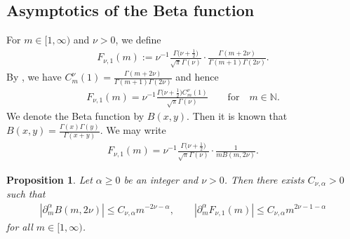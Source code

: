\documentclass[11pt]{article}
\numberwithin{equation}{section}
\newtheorem{Proposition}[Theorem]{Proposition}
 { \theoremstyle{definition}
\newtheorem{Definition}[Theorem]{Definition}
\newtheorem{Note}[Theorem]{Note}
\newtheorem{Example}[Theorem]{Example}
\newtheorem{Remark}[Theorem]{Remark} }
\def\a{\alpha}
\def\n{\nu}
\def\pa{\partial}
\begin{document}
\setcounter{subsection}{4}\setcounter{Theorem}{9}
\subsection{Asymptotics of the Beta function}\label{subsecasymbeta}

For $m\in [1,\infty)$ and $\n>0$, we define
\begin{align}\label{Fnu1def}
F_{\n,1}(m):=\n^{-1}\frac{\Gamma\bigl(\n+\frac{1}{2}\bigr)}{\sqrt{\pi}\Gamma(\n)}\cdot \frac{\Gamma(m+2\n)}{\Gamma(m+1)\Gamma(2\n)}.
\end{align}
By \cite[Fact 4.8, equation~(4.30)]{BKO}, we have $C_m^{\n}(1)=\frac{\Gamma(m+2\n)}{\Gamma(m+1)\Gamma(2\n)}$ and hence
\begin{align}\label{Fnu1Gegen}
F_{\n,1}(m)=\n^{-1}\frac{\Gamma\bigl(\n+\frac{1}{2}\bigr)C_m^{\n}(1)}{\sqrt{\pi}\Gamma(\n)}\qquad \text{for}\quad m\in\mathbb{N}.
\end{align}
We denote the Beta function by $B(x,y)$. Then it is known that $B(x,y)=\frac{\Gamma(x)\Gamma(y)}{\Gamma(x+y)}$. We may write
\begin{align}\label{Fnu1beta}
F_{\n,1}(m)=\n^{-1}\frac{\Gamma\bigl(\n+\frac{1}{2}\bigr)}{\sqrt{\pi}\Gamma(\n)}\cdot \frac{1}{mB(m,2\n)}.
\end{align}

\begin{Proposition}\label{Fnuestimate}
Let $\a\geq 0$ be an integer and $\n>0$. Then there exists $C_{\n,\a}>0$ such that
\begin{align*}
|\pa_m^{\a}B(m,2\n)|\leq C_{\n,\a}m^{-2\n-\a},\qquad |\pa_m^{\a}F_{\n,1}(m)|\leq C_{\n,\a}m^{2\n-1-\a}
\end{align*}
for all $m\in [1,\infty)$.
\end{Proposition}
\end{document}
